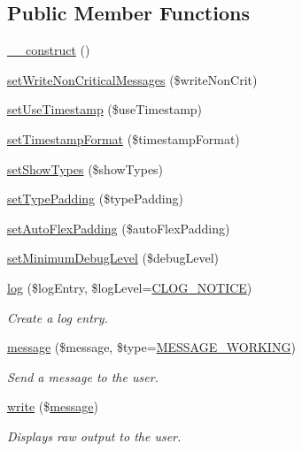 \subsection*{Public Member Functions}
\begin{DoxyCompactItemize}
\item 
\hyperlink{classPHPTerminal_ab3bda2168b4241e9829c14986e0dcd05}{\-\_\-\-\_\-construct} ()
\item 
\hyperlink{classPHPTerminal_ad99c8e1a9fe6315f644e314921e3482a}{set\-Write\-Non\-Critical\-Messages} (\$write\-Non\-Crit)
\item 
\hyperlink{classPHPTerminal_af7e9d76aa1f191f4fd66a325527b0c8a}{set\-Use\-Timestamp} (\$use\-Timestamp)
\item 
\hyperlink{classPHPTerminal_ad640ea3cb7eb05f58b86d183bbc3fa76}{set\-Timestamp\-Format} (\$timestamp\-Format)
\item 
\hyperlink{classPHPTerminal_acfcd2abaac0933fcd6869ddf36577d86}{set\-Show\-Types} (\$show\-Types)
\item 
\hyperlink{classPHPTerminal_aba5b586ffcf79965eed2bfe4395c28ef}{set\-Type\-Padding} (\$type\-Padding)
\item 
\hyperlink{classPHPTerminal_a34f61e12a023a9f7e0b6ee6b12250643}{set\-Auto\-Flex\-Padding} (\$auto\-Flex\-Padding)
\item 
\hyperlink{classPHPTerminal_a8c5203c91790187a1feec9c5f3f85d57}{set\-Minimum\-Debug\-Level} (\$debug\-Level)
\item 
\hyperlink{classPHPTerminal_af9fd2f8fb4bc8473e1da88545691b0ee}{log} (\$log\-Entry, \$log\-Level=\hyperlink{group__log__levels_ga8fe5fb4d67cefbcc5556321a2a1ffaec}{C\-L\-O\-G\-\_\-\-N\-O\-T\-I\-C\-E})
\begin{DoxyCompactList}\small\item\em Create a log entry. \end{DoxyCompactList}\item 
\hyperlink{classPHPTerminal_a8c23d7e0722fbd063c47016d5469bfed}{message} (\$message, \$type=\hyperlink{Messenger_8iface_a42a959808a10ab30584347844a7d1657}{M\-E\-S\-S\-A\-G\-E\-\_\-\-W\-O\-R\-K\-I\-N\-G})
\begin{DoxyCompactList}\small\item\em Send a message to the user. \end{DoxyCompactList}\item 
\hyperlink{classPHPTerminal_abb70c7f42af8dc0b2a2873d5182590c3}{write} (\$\hyperlink{classPHPTerminal_a8c23d7e0722fbd063c47016d5469bfed}{message})
\begin{DoxyCompactList}\small\item\em Displays raw output to the user. \end{DoxyCompactList}\end{DoxyCompactItemize}
